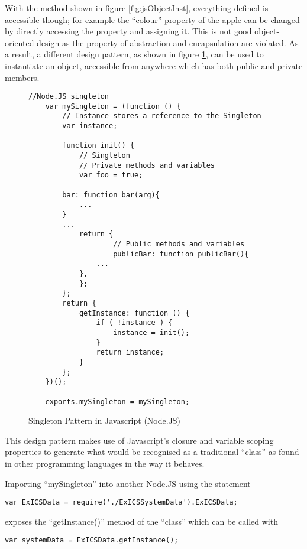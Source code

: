 With the method shown in figure \ref{fig:jsObjectInst}, everything defined is accessible though; for example the ``colour'' property of the apple can be changed by directly accessing the property and assigning it.  This is not good object-oriented design as the property of abstraction and encapsulation are violated.  As a result, a different design pattern, as shown in figure \ref{fig:nodeJSsingleton}, can be used to instantiate an object, accessible from anywhere which has both public and private members.

\begin{figure}
	\lstset{language=JavaScript}
	\begin{lstlisting}[tabsize=2,
			breaklines=true]
	//Node.JS singleton
	var mySingleton = (function () {
		// Instance stores a reference to the Singleton
		var instance;

		function init() {
			// Singleton
			// Private methods and variables
			var foo = true;

		bar: function bar(arg){
			...
		}
		...
			return {
					// Public methods and variables
					publicBar: function publicBar(){
				...
			},	
			};
		};
		return {
			getInstance: function () {
				if ( !instance ) {
					instance = init();
				}
				return instance;
			}
		};
	})();

	exports.mySingleton = mySingleton;
	\end{lstlisting}
	\caption{Singleton Pattern in Javascript (Node.JS)}
	\label{fig:nodeJSsingleton}
\end{figure}

This design pattern makes use of Javascript's closure and variable scoping properties to generate what would be recognised as a traditional ``class'' as found in other programming languages in the way it behaves.

\FloatBarrier

Importing ``mySingleton'' into another Node.JS using the statement

\FloatBarrier

\lstset{language=JavaScript}
\begin{lstlisting}[tabsize=2,
		breaklines=true]
	var ExICSData = require('./ExICSSystemData').ExICSData;
\end{lstlisting}

\FloatBarrier

exposes the ``getInstance()'' method of the ``class'' which can be called with

\FloatBarrier

\lstset{language=JavaScript}
\begin{lstlisting}[tabsize=2,
		breaklines=true]
	var systemData = ExICSData.getInstance();
\end{lstlisting}


